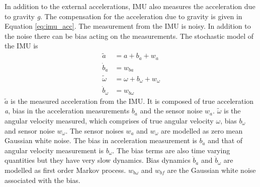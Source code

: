In addition to the external accelerations, IMU also measures the acceleration due to gravity \emph{g}. The compensation for the acceleration due to gravity is given in Equation \ref{eq:imu_acc}. The measurement from the IMU is noisy. In addition to the noise there can be bias acting on the measurements. The stochastic model of the IMU is 
\begin{equation}
\label{eq:imu_noise}
\begin{split}
\tilde{a} &= a + b_a + w_a \\
\dot{b}_a &= w_{ba} \\
\tilde{\omega} &= \omega + b_\omega + w_\omega \\
\dot{b}_\omega &= w_{b\omega}
\end{split}
\end{equation}
$\tilde{a}$ is the measured acceleration from the IMU. It is composed of true acceleration \emph{a}, bias in the acceleration measurements $b_a$ and the sensor noise $w_a$. $\tilde{\omega}$ is the angular velocity measured, which comprises of true angular velocity $\omega$, bias $b_{\omega}$ and sensor noise $w_\omega$. The sensor noises $w_a$ and $w_\omega$ are modelled as zero mean Gaussian white noise. The bias in acceleration measurement is $b_a$ and that of angular velocity measurement is $b_\omega$. The bias terms are also time varying quantities but they have very slow dynamics. Bias dynamics $\dot{b}_a$ and $\dot{b}_\omega$ are modelled as first order Markov process. $w_{b\omega}$ and $w_{bf}$ are the Gaussian white noise associated with the bias. 

